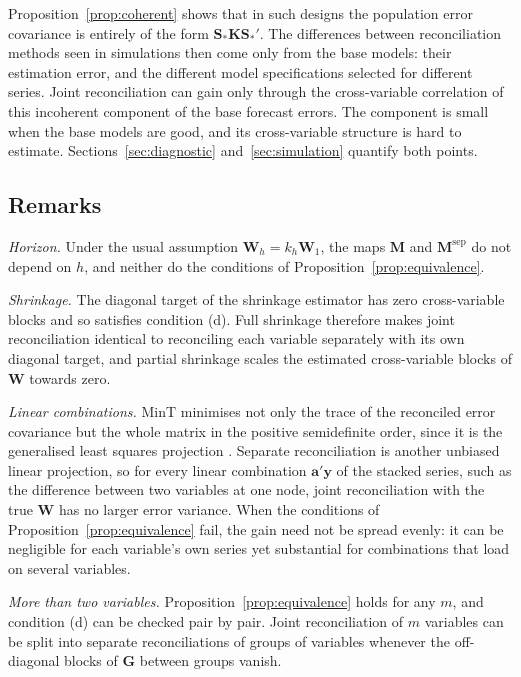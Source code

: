Proposition~\ref{prop:coherent} shows that in such designs the population error covariance is entirely of the form $\bm{S}_*\bm{K}\bm{S}_*'$. The differences between reconciliation methods seen in simulations then come only from the base models: their estimation error, and the different model specifications selected for different series. Joint reconciliation can gain only through the cross-variable correlation of this incoherent component of the base forecast errors. The component is small when the base models are good, and its cross-variable structure is hard to estimate. Sections~\ref{sec:diagnostic} and~\ref{sec:simulation} quantify both points.

\subsection{Remarks}

\emph{Horizon.} Under the usual assumption $\bm{W}_h = k_h\bm{W}_1$, the maps $\bm{M}$ and $\bm{M}^{\mathrm{sep}}$ do not depend on $h$, and neither do the conditions of Proposition~\ref{prop:equivalence}.

\emph{Shrinkage.} The diagonal target of the shrinkage estimator has zero cross-variable blocks and so satisfies condition (d). Full shrinkage therefore makes joint reconciliation identical to reconciling each variable separately with its own diagonal target, and partial shrinkage scales the estimated cross-variable blocks of $\bm{W}$ towards zero.

\emph{Linear combinations.} MinT minimises not only the trace of the reconciled error covariance but the whole matrix in the positive semidefinite order, since it is the generalised least squares projection \citep{wickramasuriya2019optimal}. Separate reconciliation is another unbiased linear projection, so for every linear combination $\bm{a}'\bm{y}$ of the stacked series, such as the difference between two variables at one node, joint reconciliation with the true $\bm{W}$ has no larger error variance. When the conditions of Proposition~\ref{prop:equivalence} fail, the gain need not be spread evenly: it can be negligible for each variable's own series yet substantial for combinations that load on several variables.

\emph{More than two variables.} Proposition~\ref{prop:equivalence} holds for any $m$, and condition (d) can be checked pair by pair. Joint reconciliation of $m$ variables can be split into separate reconciliations of groups of variables whenever the off-diagonal blocks of $\bm{G}$ between groups vanish.
